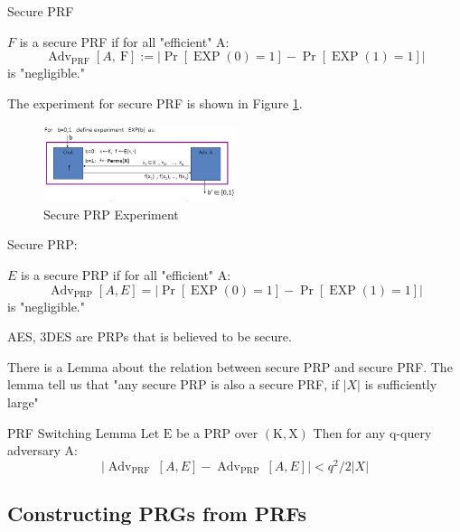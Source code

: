 \begin{definition}  Secure PRF

    $F$ is a secure PRF if for all "efficient" A:
    $$
    \operatorname{Adv}_{\mathrm{PRF}}[A, \mathrm{~F}]:=|\operatorname{Pr}[\operatorname{EXP}(0)=1]-\operatorname{Pr}[\operatorname{EXP}(1)=1]|
    $$
    is "negligible."
    
\end{definition}

The experiment for secure PRF is shown in Figure \ref{fig: 03 Secure PRP Experiment}.

\begin{figure}[h]
    \centering
    \includegraphics[width=0.5\textwidth]{Stanford_Crypto_1/fig/03_block_cipher/Secure PRP Experiment.png}
    \caption{Secure PRP Experiment}
    \label{fig: 03 Secure PRP Experiment}
\end{figure}

\begin{definition}  Secure PRP:

    $E$ is a secure PRP if for all "efficient" A:
    $$
    \operatorname{Adv}_{\mathrm{PRP}}[A, E]=|\operatorname{Pr}[\operatorname{EXP}(0)=1]-\operatorname{Pr}[\operatorname{EXP}(1)=1]|
    $$
    is "negligible."
    
\end{definition}

AES, 3DES are PRPs that is believed to be secure.

There is a Lemma about the relation between secure PRP and secure PRF. The lemma tell us that "any secure PRP is also a secure PRF, if $|X|$ is sufficiently large"
 
\begin{lemma}  PRF Switching Lemma
    Let $\mathrm{E}$ be a PRP over $(\mathrm{K}, \mathrm{X})$
    Then for any q-query adversary A:
    $$
    \left|\operatorname{Adv}_{\text {PRF }}[A, E]-\operatorname{Adv}_{\text {PRP }}[A, E]\right|<q^{2} / 2|X|
    $$
\end{lemma}


\subsection{Constructing PRGs from PRFs}

